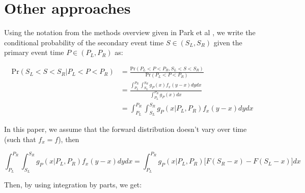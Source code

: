 \documentclass[10pt,letterpaper]{article}
\begin{document}







\appendix \section{Other approaches} 


Using the notation from the methods overview given in Park et al \cite{Park2024.01.12.24301247}, we write the conditional probability of the secondary event time $S\in (S_L,S_R)$ given the primary event time $P \in (P_L,P_R)$ as:

\begin{equation}
\begin{aligned}
\mathrm{Pr}(S_L < S < S_R | P_L < P < P_R) &= \frac{\mathrm{Pr}(P_L < P < P_R, S_L < S < S_R)}{\mathrm{Pr}(P_L < P < P_R)} \\
   &= \frac{\int_{P_L}^{P_R} \int_{S_L}^{S_R} g_P(x) f_x(y-x) dy dx}{\int_{P_L}^{P_R} g_P(x) dx}\\
   &= \int_{P_L}^{P_R} \int_{S_L}^{S_R} g_P(x|P_L, P_R) f_x(y-x)dy dx
\end{aligned}
\end{equation}

In this paper, we assume that the forward distribution doesn't vary over time (such that $f_x = f$), then

\begin{equation}
\int_{P_L}^{P_R} \int_{S_L}^{S_R} g_P(x|P_L, P_R) f_x(y-x)dy dx = \int_{P_L}^{P_R} g_P(x|P_L, P_R) \big[F(S_R - x) - F(S_L - x)\big] dx
\end{equation}

Then, by using integration by parts, we get:
\end{document}
